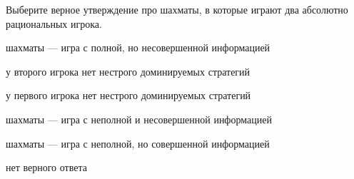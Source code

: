 
\begin{question}
Выберите верное утверждение про шахматы, в которые играют два абсолютно рациональных игрока.
\begin{answerlist}
  \item шахматы --- игра с полной, но несовершенной информацией
  \item у второго игрока нет нестрого доминируемых стратегий
  \item у первого игрока нет нестрого доминируемых стратегий
  \item шахматы --- игра с неполной и несовершенной информацией
  \item шахматы --- игра с неполной, но совершенной информацией
  \item нет верного ответа
\end{answerlist}
\end{question}


